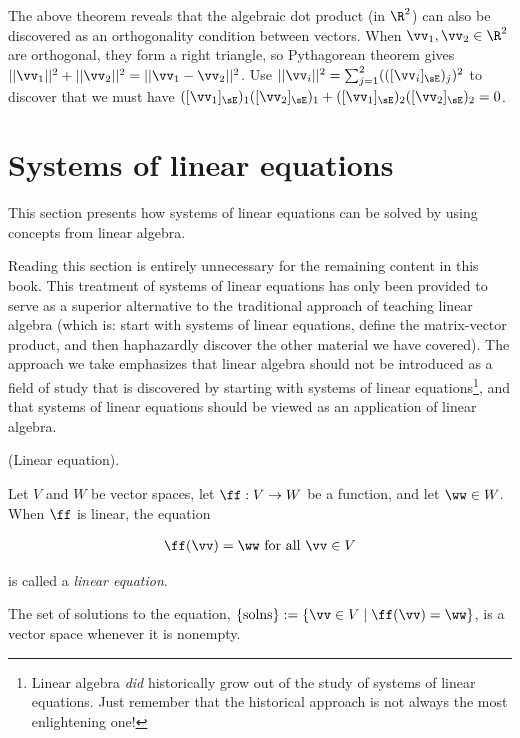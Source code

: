 \begin{remark}
    The above theorem reveals that the algebraic dot product (in $\R^2$) can also be discovered as an orthogonality condition between vectors. When $\vv_1, \vv_2 \in \R^2$ are orthogonal, they form a right triangle, so Pythagorean theorem gives $||\vv_1||^2 + ||\vv_2||^2 = ||\vv_1 - \vv_2||^2$. Use $||\vv_i||^2 = \sum_{j = 1}^2 (([\vv_i]_\sE)_j)^2$ to discover that we must have $([\vv_1]_\sE)_1 ([\vv_2]_\sE)_1 + ([\vv_1]_\sE)_2 ([\vv_2]_\sE)_2 = 0$.
\end{remark}

\section{Systems of linear equations}

This section presents how systems of linear equations can be solved by using concepts from linear algebra.

Reading this section is entirely unnecessary for the remaining content in this book. This treatment of systems of linear equations has only been provided to serve as a superior alternative to the traditional approach of teaching linear algebra (which is: start with systems of linear equations, define the matrix-vector product, and then haphazardly discover the other material we have covered). The approach we take emphasizes that linear algebra should not be introduced as a field of study that is discovered by starting with systems of linear equations\footnote{Linear algebra \textit{did} historically grow out of the study of systems of linear equations. Just remember that the historical approach is not always the most enlightening one!}, and that systems of linear equations should be viewed as an application of linear algebra.

\begin{defn}
    (Linear equation).

    Let $V$ and $W$ be vector spaces, let $\ff:V \rightarrow W$ be a function, and let $\ww \in W$. When $\ff$ is linear, the equation
    
    \begin{align*}
        \ff(\vv) = \ww \text{ for all $\vv \in V$}
    \end{align*}
    
    is called a \textit{linear equation}.

    The set of solutions to the equation, $\{\text{solns}\} := \{\vv \in V \mid \ff(\vv) = \ww\}$, is a vector space whenever it is nonempty.
\end{defn}

